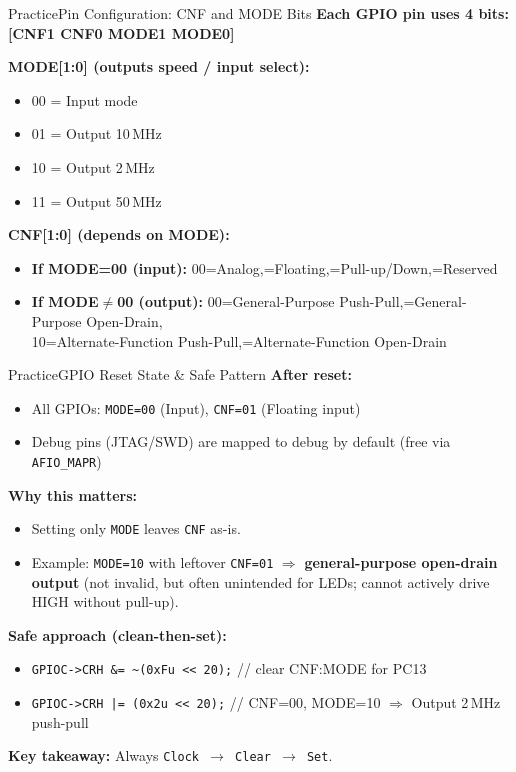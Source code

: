\documentclass{beamer}
\begin{document}
\begin{frame}{Practice}{Pin Configuration: CNF and MODE Bits}
	\textbf{Each GPIO pin uses 4 bits: [CNF1 CNF0 MODE1 MODE0]}
	\medskip
	
	\textbf{MODE[1:0] (outputs speed / input select):}
	\begin{itemize}
		\item 00 = Input mode
		\item 01 = Output 10\,MHz
		\item 10 = Output 2\,MHz
		\item 11 = Output 50\,MHz
	\end{itemize}
	
	\textbf{CNF[1:0] (depends on MODE):}
	\begin{itemize}
		\item \textbf{If MODE=00 (input):} 00=Analog,=Floating,=Pull-up/Down,=Reserved
		\item \textbf{If MODE$\neq$00 (output):} 00=General-Purpose Push-Pull,=General-Purpose Open-Drain,\\
		10=Alternate-Function Push-Pull,=Alternate-Function Open-Drain
	\end{itemize}
\end{frame}
\begin{frame}{Practice}{GPIO Reset State \& Safe Pattern}
	\textbf{After reset:}
	\begin{itemize}
		\item All GPIOs: \texttt{MODE=00} (Input), \texttt{CNF=01} (Floating input)
		\item Debug pins (JTAG/SWD) are mapped to debug by default (free via \texttt{AFIO\_MAPR})
	\end{itemize}
	
	\textbf{Why this matters:}
	\begin{itemize}
		\item Setting only \texttt{MODE} leaves \texttt{CNF} as-is.
		\item Example: \texttt{MODE=10} with leftover \texttt{CNF=01} $\Rightarrow$ \textbf{general-purpose open-drain output}
		(not invalid, but often unintended for LEDs; cannot actively drive HIGH without pull-up).
	\end{itemize}
	
	\textbf{Safe approach (clean-then-set):}
	\begin{itemize}
		\item \texttt{GPIOC->CRH \&= \textasciitilde(0xFu << 20);} \quad // clear CNF:MODE for PC13
		\item \texttt{GPIOC->CRH |=  (0x2u << 20);} \quad // CNF=00, MODE=10 $\Rightarrow$ Output 2\,MHz push-pull
	\end{itemize}
	
	\textbf{Key takeaway:} Always \texttt{Clock $\rightarrow$ Clear $\rightarrow$ Set}.
\end{frame}
\end{document}
